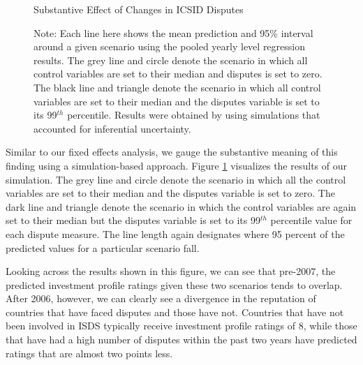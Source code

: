 \documentclass[12pt,onesided]{amsart}
\begin{document}
\begin{figure}[ht]
	\centering
	\caption{Substantive Effect of Changes in ICSID Disputes}
	\label{fig:dispEffectYearSim}
	\resizebox{1\textwidth}{!}{}
	\caption*{Note: Each line here shows the mean prediction and 95\% interval around a given scenario using the pooled yearly level regression results. The grey line and circle denote the scenario in which all control variables are set to their median and disputes is set to zero. The black line and triangle denote the scenario in which all control variables are set to their median and the disputes variable is set to its 99$^{th}$ percentile. Results were obtained by using simulations that accounted for inferential uncertainty. }
\end{figure}
\FloatBarrier

Similar to our fixed effects analysis, we gauge the substantive meaning of this finding using a simulation-based approach. Figure \ref{fig:dispEffectYearSim} visualizes the results of our simulation. The grey line and circle denote the scenario in which all the control variables are set to their median and the disputes variable is set to zero. The dark line and triangle denote the scenario in which the control variables are again set to their median but the disputes variable is set to its 99$^{th}$ percentile value for each dispute measure. The line length again designates where 95 percent of the predicted values for a particular scenario fall. 

Looking across the results shown in this figure, we can see that pre-2007, the predicted investment profile ratings given these two scenarios tends to overlap. After 2006, however, we can clearly see a divergence in the reputation of countries that have faced disputes and those have not. Countries that have not been involved in ISDS typically receive investment profile ratings of 8, while those that have had a high number of disputes within the past two years have predicted ratings that are almost two points less. 
\end{document}
